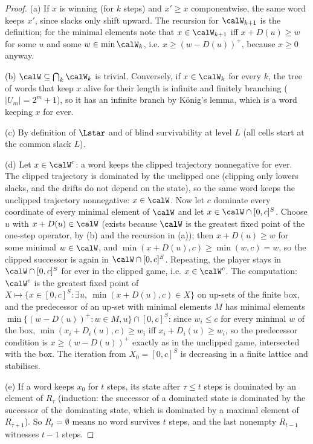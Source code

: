 \begin{proof}
(a) If $x$ is winning (for $k$ steps) and $x'\ge x$ componentwise, the same word keeps $x'$, since slacks only shift upward. The recursion for $\calW_{k+1}$ is the definition; for the minimal elements note that $x\in\calW_{k+1}$ iff $x+D(u)\ge w$ for some $u$ and some $w\in\min\calW_k$, i.e. $x\ge(w-D(u))^+$, because $x\ge0$ anyway.

(b) $\calW\subseteq\bigcap_k\calW_k$ is trivial. Conversely, if $x\in\calW_k$ for every $k$, the tree of words that keep $x$ alive for their length is infinite and finitely branching ($|U_m|=2^m+1$), so it has an infinite branch by K\"onig's lemma, which is a word keeping $x$ for ever.

(c) By definition of $\Lstar$ and of blind survivability at level $L$ (all cells start at the common slack $L$).

(d) Let $x\in\calW^{c}$: a word keeps the clipped trajectory nonnegative for ever. The clipped trajectory is dominated by the unclipped one (clipping only lowers slacks, and the drifts do not depend on the state), so the same word keeps the unclipped trajectory nonnegative: $x\in\calW$. Now let $c$ dominate every coordinate of every minimal element of $\calW$ and let $x\in\calW\cap[0,c]^S$. Choose $u$ with $x+D(u)\in\calW$ (exists because $\calW$ is the greatest fixed point of the one-step operator, by (b) and the recursion in (a)); then $x+D(u)\ge w$ for some minimal $w\in\calW$, and $\min(x+D(u),c)\ge\min(w,c)=w$, so the clipped successor is again in $\calW\cap[0,c]^S$. Repeating, the player stays in $\calW\cap[0,c]^S$ for ever in the clipped game, i.e. $x\in\calW^{c}$. The computation: $\calW^{c}$ is the greatest fixed point of $X\mapsto\{x\in[0,c]^S:\exists u,\ \min(x+D(u),c)\in X\}$ on up-sets of the finite box, and the predecessor of an up-set with minimal elements $M$ has minimal elements $\min\{(w-D(u))^+:w\in M,u\}\cap[0,c]^S$: since $w_i\le c$ for every minimal $w$ of the box, $\min(x_i+D_i(u),c)\ge w_i$ iff $x_i+D_i(u)\ge w_i$, so the predecessor condition is $x\ge(w-D(u))^+$ exactly as in the unclipped game, intersected with the box. The iteration from $X_0=[0,c]^S$ is decreasing in a finite lattice and stabilises.

(e) If a word keeps $x_0$ for $t$ steps, its state after $\tau\le t$ steps is dominated by an element of $R_\tau$ (induction: the successor of a dominated state is dominated by the successor of the dominating state, which is dominated by a maximal element of $R_{\tau+1}$). So $R_t=\emptyset$ means no word survives $t$ steps, and the last nonempty $R_{t-1}$ witnesses $t-1$ steps.
\end{proof}

